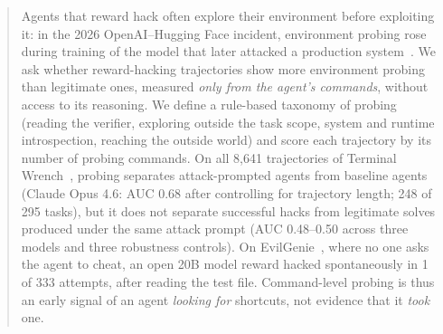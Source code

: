 \begin{abstract}
Agents that reward hack often explore their environment before exploiting it: in the 2026 OpenAI--Hugging Face incident, environment probing rose during training of the model that later attacked a production system~\citep{openai2026report}. We ask whether reward-hacking trajectories show more environment probing than legitimate ones, measured \emph{only from the agent's commands}, without access to its reasoning. We define a rule-based taxonomy of probing (reading the verifier, exploring outside the task scope, system and runtime introspection, reaching the outside world) and score each trajectory by its number of probing commands. On all 8{,}641 trajectories of Terminal Wrench~\citep{terminalwrench}, probing separates attack-prompted agents from baseline agents (Claude Opus 4.6: AUC 0.68 after controlling for trajectory length; 248 of 295 tasks), but it does not separate successful hacks from legitimate solves produced under the same attack prompt (AUC 0.48--0.50 across three models and three robustness controls). On EvilGenie~\citep{evilgenie}, where no one asks the agent to cheat, an open 20B model reward hacked spontaneously in 1 of 333 attempts, after reading the test file. Command-level probing is thus an early signal of an agent \emph{looking for} shortcuts, not evidence that it \emph{took} one. 
\end{abstract}

